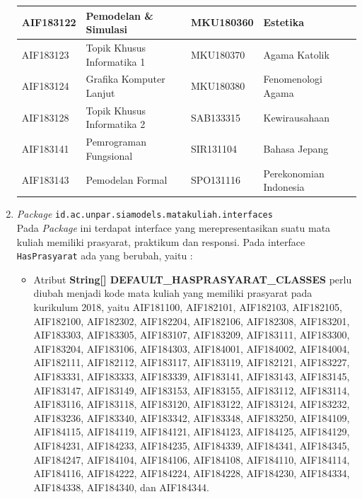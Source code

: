 \begin{enumerate}
\begin{table}[H]
\begin{tabular}{|p{3.25cm}|p{4.25cm}|p{3.25cm}|p{4.25cm}|}
AIF183122 & Pemodelan \& Simulasi & MKU180360 & Estetika \\ \hline
AIF183123 & Topik Khusus Informatika 1 & MKU180370 & Agama Katolik \\ \hline
AIF183124 & Grafika Komputer Lanjut & MKU180380 & Fenomenologi Agama \\ \hline
AIF183128 & Topik Khusus Informatika 2 & SAB133315 & Kewirausahaan \\ \hline
AIF183141 & Pemrograman Fungsional & SIR131104 & Bahasa Jepang \\ \hline
AIF183143 & Pemodelan Formal & SPO131116 & Perekonomian Indonesia \\ \hline
\end{tabular}
\end{table}
	
	\item \textit{Package} \texttt{id.ac.unpar.siamodels.matakuliah.interfaces}\\
	Pada \textit{Package} ini terdapat interface yang merepresentasikan suatu mata kuliah memiliki prasyarat, praktikum dan responsi. Pada interface \texttt{HasPrasyarat} ada yang berubah, yaitu :
	\begin{itemize}
		\item Atribut \textbf{String[] DEFAULT\_HASPRASYARAT\_CLASSES} perlu diubah menjadi kode mata kuliah yang memiliki prasyarat pada kurikulum 2018, yaitu AIF181100, AIF182101,
		AIF182103, AIF182105, AIF182100, AIF182302,
		AIF182204, AIF182106, AIF182308, AIF183201,
		AIF183303, AIF183305, AIF183107, AIF183209,
		AIF183111, AIF183300, AIF183204, AIF183106,
		AIF184303, AIF184001, AIF184002, AIF184004,
		AIF182111, AIF182112, AIF183117, AIF183119,
		AIF182121, AIF183227, AIF183331, AIF183333,
		AIF183339, AIF183141, AIF183143, AIF183145,
		AIF183147, AIF183149, AIF183153, AIF183155,
		AIF183112, AIF183114, AIF183116, AIF183118, 
		AIF183120, AIF183122, AIF183124, AIF183232,
		AIF183236, AIF183340, AIF183342, AIF183348, 
		AIF183250, AIF184109, AIF184115, AIF184119,
		AIF184121, AIF184123, AIF184125, AIF184129,
		AIF184231, AIF184233, AIF184235, AIF184339,
		AIF184341, AIF184345, AIF184247, AIF184104,
		AIF184106, AIF184108, AIF184110, AIF184114,
		AIF184116, AIF184222, AIF184224, AIF184228,
		AIF184230, AIF184334, AIF184338, AIF184340,
		dan AIF184344.
	\end{itemize}
	

\end{enumerate}
